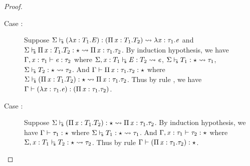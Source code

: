 \begin{proof}
\begin{description}
        \item[Case :] Suppose $ \Sigma  \vdash_{\!\!\mathsf{s} }  (  \lambda  \mathit{x}  :  T_{{\mathrm{1}}}  .  \mathit{E}  )  :  (  \Pi \, \mathit{x}  :  T_{{\mathrm{1}}}  .  T_{{\mathrm{2}}}  )   \rightsquigarrow   \lambda  \mathit{x}  :  \tau_{{\mathrm{1}}}  .  \mathit{e} $ and $ \Sigma  \vdash_{\!\!\mathsf{s} }  \Pi \, \mathit{x}  :  T_{{\mathrm{1}}}  .  T_{{\mathrm{2}}}  :  \star   \rightsquigarrow   \Pi \, \mathit{x}  :  \tau_{{\mathrm{1}}}  .  \tau_{{\mathrm{2}}} $. By induction hypothesis, we have $\Gamma  ,  \mathit{x}  :  \tau_{{\mathrm{1}}}  \vdash  \mathit{e}  :  \tau_{{\mathrm{2}}}$ where $ \Sigma  ,  \mathit{x}  :  T_{{\mathrm{1}}}  \vdash_{\!\!\mathsf{s} }  \mathit{E}  :  T_{{\mathrm{2}}}   \rightsquigarrow   \mathit{e} $, $ \Sigma  \vdash_{\!\!\mathsf{s} }  T_{{\mathrm{1}}}  :  \star   \rightsquigarrow   \tau_{{\mathrm{1}}} $, $ \Sigma  \vdash_{\!\!\mathsf{s} }  T_{{\mathrm{2}}}  :  \star   \rightsquigarrow   \tau_{{\mathrm{2}}} $. And $\Gamma  \vdash  \Pi \, \mathit{x}  :  \tau_{{\mathrm{1}}}  .  \tau_{{\mathrm{2}}}  :  \star$ where $ \Sigma  \vdash_{\!\!\mathsf{s} }  (  \Pi \, \mathit{x}  :  T_{{\mathrm{1}}}  .  T_{{\mathrm{2}}}  )  :  \star   \rightsquigarrow   \Pi \, \mathit{x}  :  \tau_{{\mathrm{1}}}  .  \tau_{{\mathrm{2}}} $. Thus by rule , we have $\Gamma  \vdash  (  \lambda  \mathit{x}  :  \tau_{{\mathrm{1}}}  .  \mathit{e}  )  :  (  \Pi \, \mathit{x}  :  \tau_{{\mathrm{1}}}  .  \tau_{{\mathrm{2}}}  )$.
        \item[Case :] Suppose $ \Sigma  \vdash_{\!\!\mathsf{s} }  (  \Pi \, \mathit{x}  :  T_{{\mathrm{1}}}  .  T_{{\mathrm{2}}}  )  :  \star   \rightsquigarrow   \Pi \, \mathit{x}  :  \tau_{{\mathrm{1}}}  .  \tau_{{\mathrm{2}}} $. By induction hypothesis, we have $\Gamma  \vdash  \tau_{{\mathrm{1}}}  :  \star$ where $ \Sigma  \vdash_{\!\!\mathsf{s} }  T_{{\mathrm{1}}}  :  \star   \rightsquigarrow   \tau_{{\mathrm{1}}} $. And $\Gamma  ,  \mathit{x}  :  \tau_{{\mathrm{1}}}  \vdash  \tau_{{\mathrm{2}}}  :  \star$ where $ \Sigma  ,  \mathit{x}  :  T_{{\mathrm{1}}}  \vdash_{\!\!\mathsf{s} }  T_{{\mathrm{2}}}  :  \star   \rightsquigarrow   \tau_{{\mathrm{2}}} $. Thus by rule  $\Gamma  \vdash  (  \Pi \, \mathit{x}  :  \tau_{{\mathrm{1}}}  .  \tau_{{\mathrm{2}}}  )  :  \star$.

\end{description}
\end{proof}
